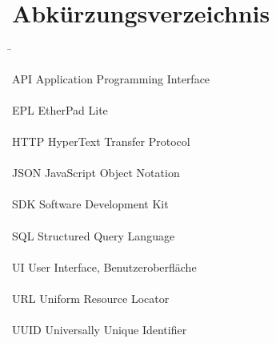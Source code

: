 \section*{Abkürzungsverzeichnis}
\label{abk:Abkuerzungsverzeichnis}
\begin{tabbing}
\hspace*{3,5cm}\=\kill

API \> Application Programming Interface\\ \\

EPL \> EtherPad Lite\\ \\

HTTP \> HyperText Transfer Protocol\\ \\

JSON \> JavaScript Object Notation\\ \\

SDK \> Software Development Kit\\ \\

SQL \> Structured Query Language\\ \\

UI \> User Interface, Benutzeroberfläche\\ \\

URL \> Uniform Resource Locator\\ \\

UUID \> Universally Unique Identifier\\ \\
\end{tabbing}

